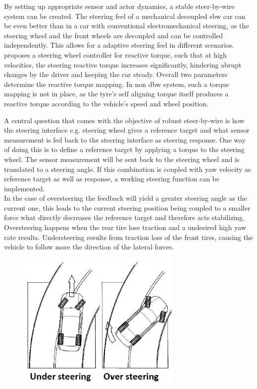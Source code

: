 \documentclass[conference]{IEEEtran}
\begin{document}
By setting up appropriate sensor and actor dynamics, a stable steer-by-wire system can be created.
The steering feel of a mechanical decoupled sbw car can be even better than in a car with conventional electromechanical steering, as the steering wheel and the front wheels are decoupled and can be controlled independently. This allows for a adaptive steering feel in different scenarios. \cite{Se-Wook} proposes a steering wheel controller for reactive torque, such that at high velocities, the steering reactive torque increases significantly, hindering abrupt changes by the driver and keeping the car steady. Overall two parameters determine the reactive torque mapping. In non dbw system, such a torque mapping is not in place, as the tyre's self aligning torque itself produces a reactive torque according to the vehicle's speed and wheel position. 

A central question that comes with the objective of robust steer-by-wire is how the steering interface e.g. steering wheel gives a reference target and what sensor measurement is fed back to the steering interface as steering response. One way of doing this is to define a reference target by applying a torque to the steering wheel. The sensor measurement will be sent back to the steering wheel and is translated to a steering angle. If this combination is coupled with yaw velocity as reference 
target as well as response, a working steering function can be implemented. \\
In the case of oversteering the feedback will yield a greater steering angle as the current one, this leads to the current steering position being coupled to a smaller force what directly decreases the reference target and therefore acts stabilizing. Oversteering happens when the rear tire lose traction and a undesired high yaw rate results.
Understeering results from traction loss of the front tires, causing the vehicle to follow more the direction of the lateral forces.

\begin{figure}[h]
	\centering
	\includegraphics[width=0.7\linewidth]{pictures/Figure-1-Under-steering-vs-over-steering}
	\caption{}
	\label{fig:figure-1-under-steering-vs-over-steering}
\end{figure}
\end{document}
